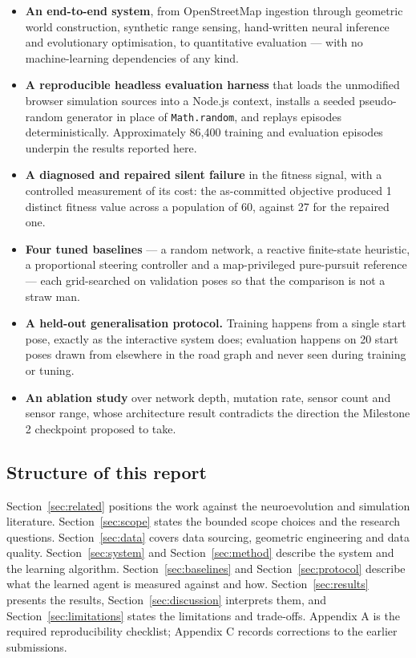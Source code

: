 \documentclass[conference]{IEEEtran}
\begin{document}
\begin{itemize}
\item \textbf{An end-to-end system}, from OpenStreetMap ingestion through geometric world construction, synthetic range sensing, hand-written neural inference and evolutionary optimisation, to quantitative evaluation — with no machine-learning dependencies of any kind.
\item \textbf{A reproducible headless evaluation harness} that loads the unmodified browser simulation sources into a Node.js context, installs a seeded pseudo-random generator in place of \texttt{Math.random}, and replays episodes deterministically. Approximately 86,400 training and evaluation episodes underpin the results reported here.
\item \textbf{A diagnosed and repaired silent failure} in the fitness signal, with a controlled measurement of its cost: the as-committed objective produced 1 distinct fitness value across a population of 60, against 27 for the repaired one.
\item \textbf{Four tuned baselines} — a random network, a reactive finite-state heuristic, a proportional steering controller and a map-privileged pure-pursuit reference — each grid-searched on validation poses so that the comparison is not a straw man.
\item \textbf{A held-out generalisation protocol.} Training happens from a single start pose, exactly as the interactive system does; evaluation happens on 20 start poses drawn from elsewhere in the road graph and never seen during training or tuning.
\item \textbf{An ablation study} over network depth, mutation rate, sensor count and sensor range, whose architecture result contradicts the direction the Milestone 2 checkpoint proposed to take.
\end{itemize}

\subsection{Structure of this report}

\label{sec:structure}

Section~\ref{sec:related} positions the work against the neuroevolution and simulation literature. Section~\ref{sec:scope} states the bounded scope choices and the research questions. Section~\ref{sec:data} covers data sourcing, geometric engineering and data quality. Section~\ref{sec:system} and Section~\ref{sec:method} describe the system and the learning algorithm. Section~\ref{sec:baselines} and Section~\ref{sec:protocol} describe what the learned agent is measured against and how. Section~\ref{sec:results} presents the results, Section~\ref{sec:discussion} interprets them, and Section~\ref{sec:limitations} states the limitations and trade-offs. Appendix A is the required reproducibility checklist; Appendix C records corrections to the earlier submissions.
\end{document}
